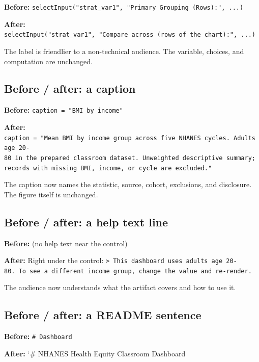 \documentclass[
  letterpaper,
  DIV=11,
  numbers=noendperiod,
  oneside]{scrreprt}
\begin{document}
\textbf{Before:}
\texttt{selectInput("strat\_var1",\ "Primary\ Grouping\ (Rows):",\ ...)}

\textbf{After:}
\texttt{selectInput("strat\_var1",\ "Compare\ across\ (rows\ of\ the\ chart):",\ ...)}

The label is friendlier to a non-technical audience. The variable,
choices, and computation are unchanged.

\subsection*{Before / after: a caption}\label{before-after-a-caption}

\textbf{Before:} \texttt{caption\ =\ "BMI\ by\ income"}

\textbf{After:}
\texttt{caption\ =\ "Mean\ BMI\ by\ income\ group\ across\ five\ NHANES\ cycles.\ Adults\ age\ 20-80\ in\ the\ prepared\ classroom\ dataset.\ Unweighted\ descriptive\ summary;\ records\ with\ missing\ BMI,\ income,\ or\ cycle\ are\ excluded."}

The caption now names the statistic, source, cohort, exclusions, and
disclosure. The figure itself is unchanged.

\subsection*{Before / after: a help text
line}\label{before-after-a-help-text-line}

\textbf{Before:} (no help text near the control)

\textbf{After:} Right under the control:
\texttt{\textgreater{}\ This\ dashboard\ uses\ adults\ age\ 20-80.\ To\ see\ a\ different\ income\ group,\ change\ the\ value\ and\ re-render.}

The audience now understands what the artifact covers and how to use it.

\subsection*{Before / after: a README
sentence}\label{before-after-a-readme-sentence}

\textbf{Before:} \texttt{\#\ Dashboard}

\textbf{After:} `\# NHANES Health Equity Classroom Dashboard
\end{document}
